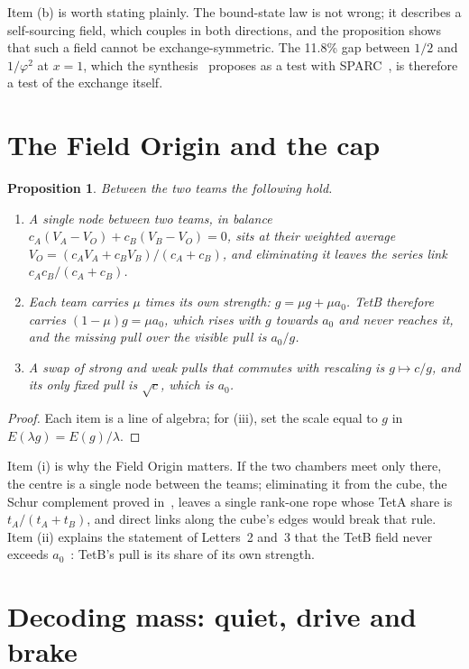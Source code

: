 \documentclass[twocolumn]{iopjournal}
\newtheorem{proposition}{Proposition}
\theoremstyle{definition}
\theoremstyle{remark}
\begin{document}
Item (b) is worth stating plainly. The bound-state law is not wrong; it
describes a self-sourcing field, which couples in both directions, and the
proposition shows that such a field cannot be exchange-symmetric. The
11.8\% gap between $1/2$ and $1/\varphi^2$ at $x = 1$, which the
synthesis~\cite{NelsonSynth} proposes as a test with SPARC~\cite{SPARC}, is
therefore a test of the exchange itself.

\section*{The Field Origin and the cap}

\begin{proposition}\label{prop:node}
Between the two teams the following hold.
\begin{enumerate}
\item[(i)] A single node between two teams, in balance
  $c_A(V_A - V_O) + c_B(V_B - V_O) = 0$, sits at their weighted average
  $V_O = (c_AV_A + c_BV_B)/(c_A + c_B)$, and eliminating it leaves the
  series link $c_Ac_B/(c_A+c_B)$.
\item[(ii)] Each team carries $\mu$ times its own strength:
  $g = \mu g + \mu a_0$. TetB therefore carries $(1-\mu)g = \mu a_0$, which
  rises with $g$ towards $a_0$ and never reaches it, and the missing pull
  over the visible pull is $a_0/g$.
\item[(iii)] A swap of strong and weak pulls that commutes with rescaling
  is $g \mapsto c/g$, and its only fixed pull is $\sqrt c$, which is $a_0$.
\end{enumerate}
\end{proposition}

\begin{proof}
Each item is a line of algebra; for (iii), set the scale equal to $g$ in
$E(\lambda g) = E(g)/\lambda$.
\end{proof}

Item (i) is why the Field Origin matters. If the two chambers meet only
there, the centre is a single node between the teams; eliminating it from
the cube, the Schur complement proved in~\cite{NelsonWalsh}, leaves a
single rank-one rope whose TetA share is $t_A/(t_A + t_B)$, and direct
links along the cube's edges would break that rule. Item (ii) explains the
statement of Letters~2 and~3 that the TetB field never exceeds
$a_0$~\cite{NelsonL2,NelsonL3}: TetB's pull is its share of its own
strength.

\section*{Decoding mass: quiet, drive and brake}
\end{document}
